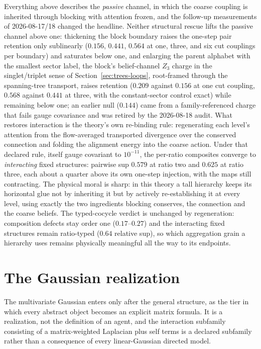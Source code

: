 \documentclass[11pt,letterpaper]{article}
\begin{document}
Everything above describes the \emph{passive} channel, in which the coarse coupling is inherited through blocking with attention frozen, and the follow-up measurements of 2026-08-17/18 changed the headline. Neither structural rescue lifts the passive channel above one: thickening the block boundary raises the one-step pair retention only sublinearly ($0.156$, $0.441$, $0.564$ at one, three, and six cut couplings per boundary) and saturates below one, and enlarging the parent alphabet with the smallest sector label, the block's belief-channel $Z_3$ charge in the singlet/triplet sense of Section~\ref{sec:trees-loops}, root-framed through the spanning-tree transport, raises retention ($0.209$ against $0.156$ at one cut coupling, $0.568$ against $0.441$ at three, with the constant-sector control exact) while remaining below one; an earlier null ($0.144$) came from a family-referenced charge that fails gauge covariance and was retired by the 2026-08-18 audit. What restores interaction is the theory's own re-binding rule: regenerating each level's attention from the flow-averaged transported divergence over the conserved connection and folding the alignment energy into the coarse action. Under that declared rule, itself gauge covariant to $10^{-11}$, the per-ratio composites converge to \emph{interacting} fixed structures: pairwise sup $0.579$ at ratio two and $0.625$ at ratio three, each about a quarter above its own one-step injection, with the maps still contracting. The physical moral is sharp: in this theory a tall hierarchy keeps its horizontal glue not by inheriting it but by actively re-establishing it at every level, using exactly the two ingredients blocking conserves, the connection and the coarse beliefs. The typed-cocycle verdict is unchanged by regeneration: composition defects stay order one ($0.17$--$0.27$) and the interacting fixed structures remain ratio-typed ($0.64$ relative sup), so which aggregation grain a hierarchy uses remains physically meaningful all the way to its endpoints.

\section{The Gaussian realization}

The multivariate Gaussian enters only after the general structure, as the tier in which every abstract object becomes an explicit matrix formula. It is a realization, not the definition of an agent, and the interaction subfamily consisting of a matrix-weighted Laplacian plus self terms is a declared subfamily rather than a consequence of every linear-Gaussian directed model.
\end{document}
